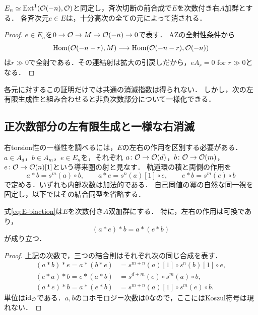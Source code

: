 \documentclass[11pt,a4paper]{ltjsarticle}
\begin{document}
\begin{proposition}[各元のtorsion性]\label{prop:torsion}
$E_n\simeq\operatorname{Ext}^1(\mathcal O(-n),\mathcal O)$と同定し，斉次切断の前合成で$E$を次数付き右$A$加群とする．
各斉次元$e\in E$は，十分高次の全ての元によって消される．
\end{proposition}
\begin{proof}
$e\in E_n$を$0\to\mathcal O\to M\to\mathcal O(-n)\to0$で表す．
AZの全射性条件から
\[
 \operatorname{Hom}(\mathcal O(-n-r),M)\longrightarrow\operatorname{Hom}(\mathcal O(-n-r),\mathcal O(-n))
\]
は$r\gg0$で全射である．その連結射は拡大の引戻しだから，$eA_r=0$ for $r\gg0$となる．
\end{proof}

各元に対するこの証明だけでは共通の消滅指数は得られない．
しかし，次の左有限生成性と組み合わせると非負次数部分について一様化できる．

\subsection{正次数部分の左有限生成と一様な右消滅}

右torsion性の一様性を調べるには，$E$の左右の作用を区別する必要がある．
$a\in A_d$，$b\in A_m$，$e\in E_n$を，それぞれ
$a\colon\mathcal O\to\mathcal O(d)$，$b\colon\mathcal O\to\mathcal O(m)$，
$e\colon\mathcal O\to\mathcal O(n)[1]$という導来圏の射と見なす．
軌道環の積と両側の作用を
\begin{equation}\label{eq:E-biaction}
 a*b=s^m(a)\circ b,\qquad
 a*e=s^n(a)[1]\circ e,\qquad
 e*b=s^m(e)\circ b
\end{equation}
で定める．いずれも内部次数は加法的である．
自己同値の冪の自然な同一視を固定し，以下ではその結合同型を省略する．

\begin{lemma}\label{lem:E-bimodule}
式\eqref{eq:E-biaction}は$E$を次数付き$A$双加群にする．
特に，左右の作用は可換であり，
\[
 (a*e)*b=a*(e*b)
\]
が成り立つ．
\end{lemma}
\begin{proof}
上記の次数で，三つの結合則はそれぞれ次の同じ合成を表す．
\begin{align*}
 (a*b)*e=a*(b*e)
   &=s^{m+n}(a)[1]\circ s^n(b)[1]\circ e,\\
 (e*a)*b=e*(a*b)
   &=s^{d+m}(e)\circ s^m(a)\circ b,\\
 (a*e)*b=a*(e*b)
   &=s^{m+n}(a)[1]\circ s^m(e)\circ b.
\end{align*}
単位は$\operatorname{id}_{\mathcal O}$である．$a,b$のコホモロジー次数は0なので，ここにはKoszul符号は現れない．
\end{proof}
\end{document}
